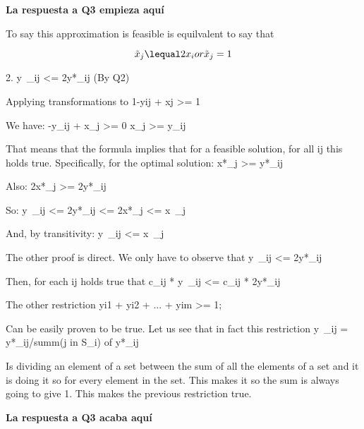 \textbf{La respuesta a Q3 empieza aquí}

To say this approximation is feasible is equilvalent to say that


\begin{equation}\label{eq:pythagoras}

  \tilde{x}_{j} \lequal 2x_{i} or \tilde{x}_{j} = 1
  
\end{equation}
  
  2. y~_ij <= 2y*_ij (By Q2)


Applying transformations to 
  1-yij + xj >= 1

We have:
  -y_ij + x_j >= 0
  x_j >= y_ij

That means that the formula implies that for a feasible solution,
for all ij this holds true. Specifically, for the optimal solution:
  x*_j >= y*_ij

Also:
  2x*_j >= 2y*_ij
  
So:
  y~_ij <= 2y*_ij <= 2x*_j <= x~_j

And, by transitivity:
  y~_ij <= x~_j

The other proof is direct. We only have to observe that
  y~_ij <= 2y*_ij

Then, for each ij holds true that
  c_ij * y~_ij <= c_ij * 2y*_ij

The other restriction
  yi1 + yi2 + ... + yim >= 1;

Can be easily proven to be true.
Let us see that in fact this restriction
  y~_ij = y*_ij/summ(j in S_i) of y*_ij

Is dividing an element of a set between the sum of all the elements of a set
and it is doing it so for every element in the set. This makes it so the sum
is always going to give 1. This makes the previous restriction true.

\textbf{La respuesta a Q3 acaba aquí}
